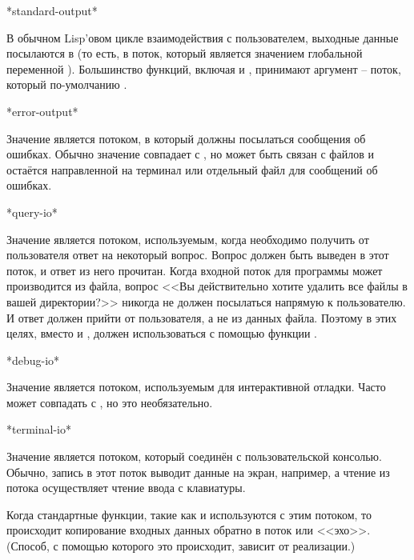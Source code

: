 \begin{defun}[Переменная]
*standard-output*

В обычном Lisp'овом цикле взаимодействия с пользователем, выходные данные
посылаются в  (то есть, в поток, который является
значением глобальной переменной ). Большинство функций,
включая  и , принимают аргумент -- поток, который
по-умолчанию .
\end{defun}

\begin{defun}[Переменная]
*error-output*

Значение  является потоком, в который должны посылаться
сообщения об ошибках. Обычно значение совпадает с , но
 может быть связан с файлов и 
остаётся направленной на терминал или отдельный файл для сообщений об ошибках.
\end{defun}

\begin{defun}[Переменная]
*query-io*

Значение  является потоком, используемым, когда необходимо
получить от пользователя ответ на некоторый вопрос. Вопрос должен быть выведен в
этот поток, и ответ из него прочитан. Когда входной поток для программы может
производится из файла, вопрос <<Вы действительно хотите удалить все файлы в
вашей директории?>> никогда не должен посылаться напрямую к пользователю. И
ответ должен прийти от пользователя, а не из данных файла.
Поэтому в этих целях, вместо  и ,
должен использоваться  с помощью функции .
\end{defun}

\begin{defun}[Переменная]
*debug-io*

Значение  является потоком, используемым для интерактивной
отладки. Часто может совпадать с , но это необязательно.
\end{defun}

\begin{defun}[Переменная]
*terminal-io*

Значение  является потоком, который соединён с
пользовательской консолью. Обычно, запись в этот поток выводит данные на экран,
например, а чтение из потока осуществляет чтение ввода с клавиатуры.

Когда стандартные функции, такие как  и  используются с
этим потоком, то происходит копирование входных данных обратно в поток
или <<эхо>>. (Способ, с помощью которого это происходит, зависит от реализации.)
\end{defun}

